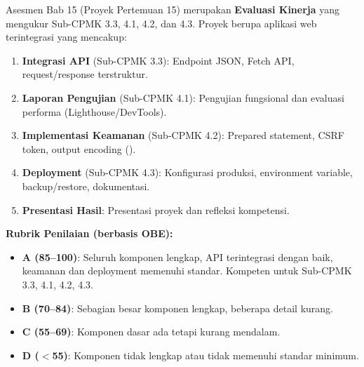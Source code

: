 \documentclass[../main.tex]{subfiles}
\begin{document}
\begin{asesmen}
Asesmen Bab 15 (Proyek Pertemuan 15) merupakan \textbf{Evaluasi Kinerja} yang mengukur Sub-CPMK 3.3, 4.1, 4.2, dan 4.3. Proyek berupa aplikasi web terintegrasi yang mencakup:
\begin{enumerate}
  \item \textbf{Integrasi API} (Sub-CPMK 3.3): Endpoint JSON, Fetch API, request/response terstruktur.
  \item \textbf{Laporan Pengujian} (Sub-CPMK 4.1): Pengujian fungsional dan evaluasi performa (Lighthouse/DevTools).
  \item \textbf{Implementasi Keamanan} (Sub-CPMK 4.2): Prepared statement, CSRF token, output encoding ().
  \item \textbf{Deployment} (Sub-CPMK 4.3): Konfigurasi produksi, environment variable, backup/restore, dokumentasi.
  \item \textbf{Presentasi Hasil}: Presentasi proyek dan refleksi kompetensi.
\end{enumerate}

\textbf{Rubrik Penilaian (berbasis OBE):}
\begin{itemize}
  \item \textbf{A (85--100)}: Seluruh komponen lengkap, API terintegrasi dengan baik, keamanan dan deployment memenuhi standar. Kompeten untuk Sub-CPMK 3.3, 4.1, 4.2, 4.3.
  \item \textbf{B (70--84)}: Sebagian besar komponen lengkap, beberapa detail kurang.
  \item \textbf{C (55--69)}: Komponen dasar ada tetapi kurang mendalam.
  \item \textbf{D ($<$55)}: Komponen tidak lengkap atau tidak memenuhi standar minimum.
\end{itemize}
\end{asesmen}
\end{document}
